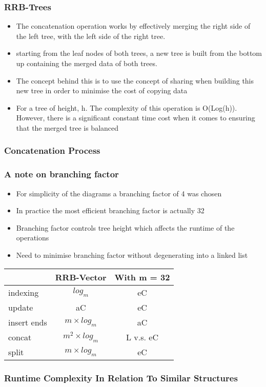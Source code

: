 \documentclass{beamer}
\begin{document}
 
\begin{frame}
\frametitle{RRB-Trees}

	\begin{itemize}
	
		\item The concatenation operation works by effectively merging the right side of the left tree, with the left side of the right tree. 
		\item starting from the leaf nodes of both trees, a new tree is built from the bottom up containing the merged data of both trees.
		\item The concept behind this is to use the concept of sharing when building this new tree in order to minimise the cost of copying data
		\item For a tree of height, h. The complexity of this operation is O(Log(h)). However, there is a significant constant time cost when it comes to ensuring that the merged tree is balanced
	
	\end{itemize}

\end{frame}
 
 
\begin{frame}
\frametitle{Concatenation Process}


\end{frame}

\begin{frame}
\frametitle{A note on branching factor}

	\begin{itemize}
		\item For simplicity of the diagrams a branching factor of 4 was chosen
		\item In practice the most efficient branching factor is actually 32
		\item Branching factor controls tree height which affects the runtime of the operations
		\item Need to minimise branching factor without degenerating into a linked list
	\end{itemize}
	
	\begin{center}
	
	\begin{tabular}{| l || c | c |}
		\hline
		& RRB-Vector & With m = 32 \\
		\hline
		indexing & $ log_m $ & eC\\
		update & aC & eC \\
		insert ends & $ m \times log_m $ & aC \\
		concat & $ m^2 \times log_m $ & L v.s. eC \\
		split & $ m \times log_m $ & eC \\
		\hline
		\end{tabular}
	\end{center}


\end{frame}

\begin{frame}
\frametitle{Runtime Complexity In Relation To Similar Structures}



\end{frame}
\end{document}
